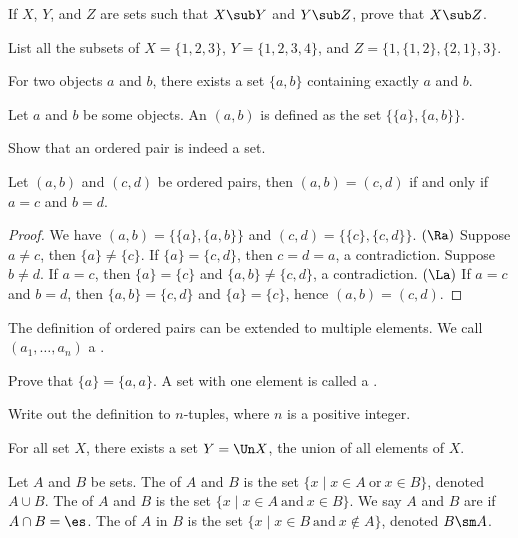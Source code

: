 \documentclass[10pt]{article}
\begin{document}
\begin{problem}
    If $X$, $Y$, and $Z$ are sets such that $X\sub Y$ and $Y\sub Z$, prove that $X\sub Z$.
\end{problem}
\begin{problem}
    List all the subsets of $X=\{1,2,3\}$, $Y=\{1,2,3,4\}$, and $Z=\{1,\{1,2\},\{2,1\},3\}$.
\end{problem}
\begin{Axiom of pairing}
    For two objects $a$ and $b$, there exists a set $\{a,b\}$ containing exactly $a$ and $b$.
\end{Axiom of pairing}
\begin{definition}
    Let $a$ and $b$ be some objects. An  $(a,b)$ is defined as the set $\{\{a\},\{a,b\}\}$.
\end{definition}
\begin{problem}
    Show that an ordered pair is indeed a set.
\end{problem}
\begin{proposition}
    Let $(a,b)$ and $(c,d)$ be ordered pairs, then $(a,b)=(c,d)$ if and only if $a=c$ and $b=d$.
\end{proposition}
\begin{proof}
    We have $(a,b)=\{\{a\},\{a,b\}\}$ and $(c,d)=\{\{c\},\{c,d\}\}$. $(\Ra)$ Suppose $a\ne c$, then $\{a\}\ne\{c\}$. If $\{a\}=\{c,d\}$, then $c=d=a$, a contradiction. Suppose $b\ne d$. If $a=c$, then $\{a\}=\{c\}$ and $\{a,b\}\ne\{c,d\}$, a contradiction. $(\La)$ If $a=c$ and $b=d$, then $\{a,b\}=\{c,d\}$ and $\{a\}=\{c\}$, hence $(a,b)=(c,d)$.
\end{proof}
\par
The definition of ordered pairs can be extended to multiple elements. We call $({a}_{1},\dots,{a}_{n})$ a .
\begin{problem}
    Prove that $\{a\}=\{a,a\}$. A set with one element is called a .
\end{problem}
\begin{problem}
    Write out the definition to $n$-tuples, where $n$ is a positive integer.
\end{problem}
\begin{Axiom of union}
    For all set $X$, there exists a set $Y=\Un X$, the union of all elements of $X$.
\end{Axiom of union}
\begin{definition}
    Let $A$ and $B$ be sets. The  of $A$ and $B$ is the set $\{x\mid x\in A\ \text{or}\ x\in B\}$, denoted $A\cup B$. The  of $A$ and $B$ is the set $\{x\mid x\in A\ \text{and}\ x\in B\}$. We say $A$ and $B$ are  if $A\cap B=\es$. The  of $A$ in $B$ is the set $\{x\mid x\in B\ \text{and}\ x\notin A\}$, denoted $B\sm A$.
\end{definition}
\end{document}
